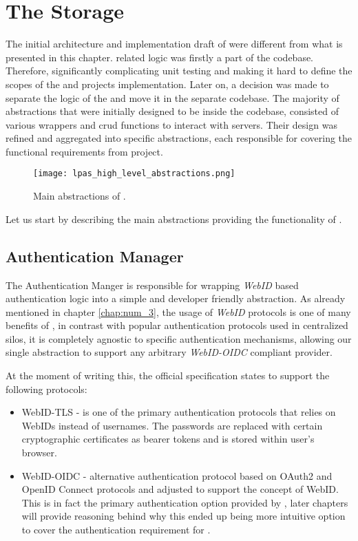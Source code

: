 \section{The Storage}

The initial architecture and implementation draft of \lpas{} were different from what is presented in this chapter.  \solid{} related logic was firstly a part of the \lpa{} codebase. Therefore, significantly complicating unit testing and making it hard to define the scopes of the \lpa{} and \lpas{} projects implementation. Later on, a decision was made to separate the logic of the \lpas{} and move it in the separate codebase. The majority of abstractions that were initially designed to be inside the \lpa{} codebase, consisted of various wrappers and crud functions to interact with \solid{} servers. Their design was refined and aggregated into specific abstractions, each responsible for covering the functional requirements from \lpa{} project.

\begin{figure}[h]
\centering
\texttt{[image: lpas\_high\_level\_abstractions.png]}
\caption{Main abstractions of \lpas.}
\label{fig:lpas_high_level_abstractions}
\end{figure}

Let us start by describing the main abstractions providing the functionality of \lpas{}.

\subsection{Authentication Manager}

The Authentication Manger is responsible for wrapping \solid{} \textit{WebID} based authentication logic into a simple and developer friendly abstraction. As already mentioned in chapter \ref{chap:num_3}, the usage of \textit{WebID} protocols is one of many benefits of \solid{}, in contrast with popular authentication protocols used in centralized silos, it is completely agnostic to specific authentication mechanisms, allowing our single abstraction to support any arbitrary \textit{WebID-OIDC} compliant \solid{} provider.

At the moment of writing this, the official \solid{} specification states to support the following protocols:
\begin{itemize}
\item WebID-TLS  - is one of the primary authentication protocols that relies on WebIDs instead of usernames. The passwords are replaced with certain cryptographic certificates as bearer tokens and is stored within user's browser.
\item WebID-OIDC - alternative authentication protocol based on OAuth2 and OpenID Connect protocols and adjusted to support the concept of WebID. This is in fact the primary authentication option provided by \lpas{}, later chapters will provide reasoning behind why this ended up being more intuitive option to cover the authentication requirement for \lpa{}.   
\end{itemize}

